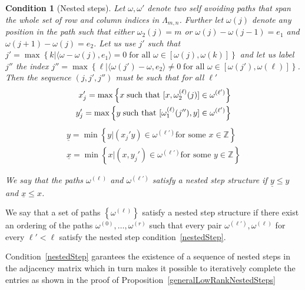 \documentclass[12pt]{article}
\newtheorem{condition}{Condition}
\begin{document}
\begin{condition}[\label{nestedStep}Nested steps]


Let $\omega, \omega'$ denote two self avoiding paths that span the whole set of row and column indices in $\Lambda_{m,n}$.  Further let $\omega(j)$ denote any position in the path such that either $\omega_2(j) = m$ or $\omega(j) - \omega(j-1) = e_1$ and $\omega(j+1)-\omega(j) = e_2$.  Let us use $j'$ such that $j' = \max\left\{k| \langle \omega - \omega(j),e_1\rangle =  0\; \text{for all $\omega \in [\omega(j), \omega(k)]$}\right\}$ and let us label $j''$ the index $j'' = \max\left\{\ell| \langle \omega(j') - \omega,e_2\rangle \neq 0\; \text{for all $\omega \in [\omega(j'), \omega(\ell)]$}\right\}$. Then the sequence $(j,j',j'')$ must be such that for all $\ell'$ 
\begin{align}
x_{j}' = \max \left\{x \; \text{\upshape such that }[x, \omega^{(\ell)}_2(j)]\in \omega^{(\ell')}\right\}\\
y_{j}' = \max \left\{y\; \text{\upshape such that }[\omega^{(\ell)}_1(j''), y] \in \omega^{(\ell')}\right\}
\end{align}
\begin{align}
\underline{y} = \min \left\{y| (x_j' y)\in \omega^{(\ell')}\text{for some $x\in \mathbb{Z}$}\right\}\\
\underline{x} = \min \left\{x| (x, y_j')\in \omega^{(\ell')}\text{for some $y\in \mathbb{Z}$}\right\}
\end{align}

We say that the paths $\omega^{(\ell)}$ and $\omega^{(\ell')}$ satisfy a nested step structure if  $\underline{y}\leq y$ and $\underline{x}\leq x$. 
\end{condition}

We say that a set of paths $\left\{\omega^{(\ell)}\right\}$ satisfy a nested step structure if there exist an ordering of the paths $\omega^{(0)}, \ldots, \omega^{(r)}$ such that every pair $\omega^{(\ell')}, \omega^{(\ell)}$ for every $\ell'<\ell$ satisfy the nested step condition~\ref{nestedStep}. 


Condition~\ref{nestedStep} garantees the existence of a sequence of nested steps in the adjacency matrix which in turn makes it possible to iteratively complete the entries as shown in the proof of Proposition~\ref{generalLowRankNestedSteps} 
\end{document}
